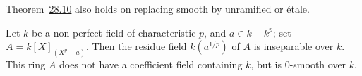 \begin{exercise}\label{ex:28.1-ex}
Theorem~\hyperref[thm:28.10]{28.10} also holds on replacing smooth by unramified or \'etale.
\end{exercise}

\begin{exercise}\label{ex:28.2-ex}
Let $k$ be a non-perfect field of characteristic $p$, and $a \in k - k^p$; set
$A = k[X]_{(X^p - a)}$. Then the residue field $k(a^{1/p})$ of $A$ is inseparable over
$k$. This ring $A$ does not have a coefficient field containing $k$, but is
0-smooth over $k$.
\end{exercise}
